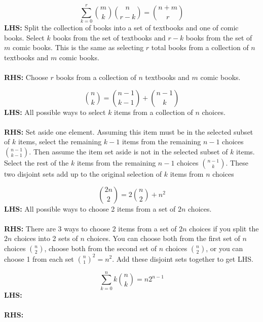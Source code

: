 \documentclass{article}\usepackage{amsmath,amssymb,amsthm,tikz,tkz-graph,color,chngpage,soul,hyperref,csquotes,graphicx,floatrow, listings}\newcommand*{\QEDB}{\hfill\ensuremath{\square}}\newtheorem*{prop}{Proposition}\renewcommand{\theenumi}{\alph{enumi}}\usepackage[shortlabels]{enumitem}\usepackage[nobreak=true]{mdframed}\usetikzlibrary{matrix,calc}\MakeOuterQuote{"}\usepackage[margin=0.75in]{geometry} \newtheorem{theorem}{Theorem}\newcommand{\Z}{\mathbb Z}\newcommand{\R}{\mathbb R}\newcommand{\Q}{\mathbb Q}\newcommand{\N}{\mathbb N}\newcommand{\x}[1]{\textrm{ #1 }}\newcommand{\pr}{\textrm{Pr}}
\newcommand{\sumlim}[3]{\sum\limits_{#1}^{#2}#3}
\newcommand{\eq}[1]{\begin{equation}#1\end{equation}}
\begin{document}
\begin{mdframed}
\eq{\sumlim{k=0}{r}{\binom{m}{k}\binom{n}{r-k}}=\binom{n+m}{r}}
\textbf{LHS:} Split the collection of books into a set of textbooks and one of comic books. Select $k$ books from the set of textbooks and $r-k$ books from the set of $m$ comic books. This is the same as selecting $r$ total books from a collection of $n$ textbooks and $m$ comic books.\\\\
\textbf{RHS:} Choose $r$ books from a collection of $n$ textbooks and $m$ comic books.
\end{mdframed}
\begin{mdframed}
\eq{\binom{n}{k}=\binom{n-1}{k-1}+\binom{n-1}{k}}
\textbf{LHS:} All possible ways to select $k$ items from a collection of $n$ choices.\\\\
\textbf{RHS:} Set aside one element. Assuming this item must be in the selected subset of $k$ items, select the remaining $k-1$ items from the remaining $n-1$ choices $\binom{n-1}{k-1}$. Then assume the item set aside is not in the selected subset of $k$ items. Select the rest of the $k$ items from the remaining $n-1$ choices $\binom{n-1}{k}$. These two disjoint sets add up to the original selection of $k$ items from $n$ choices
\end{mdframed}
\begin{mdframed}
\eq{\binom{2n}{2}=2\binom{n}{2}+n^2}
\textbf{LHS:} All possible ways to choose 2 items from a set of $2n$ choices.\\\\
\textbf{RHS:} There are 3 ways to choose $2$ items from a set of $2n$ choices if you split the $2n$ choices into 2 sets of $n$ choices. You can choose both from the first set of $n$ choices $\binom{n}{2}$, choose both from the second set of $n$ choices $\binom{n}{2}$, or you can choose 1 from each set $\binom{n}{1}^2=n^2$. Add these disjoint sets together to get LHS.
\end{mdframed}
\begin{mdframed}
\eq{\sumlim{k=0}{n}k\binom{n}{k}=n2^{n-1}}
\textbf{LHS:} \\\\
\textbf{RHS:} 
\end{mdframed}
\end{document}
